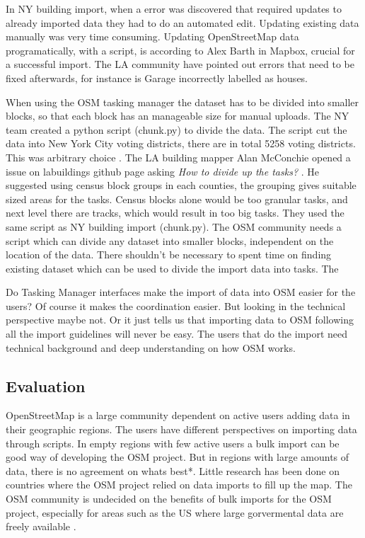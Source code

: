 In NY building import, when a error was discovered that required updates to already imported data they had to do an automated edit. Updating existing data manually was very time consuming. Updating OpenStreetMap data programatically, with a script, is according to Alex Barth in Mapbox, crucial for a successful import.  The LA community have pointed out errors that need to be fixed afterwards, for instance is Garage incorrectly labelled as houses. 

When using the OSM tasking manager the dataset has to be divided into smaller blocks, so that each block has an manageable size for manual uploads. The NY team created a python script (chunk.py) to divide the data. The script cut the data into New York City voting districts, there are in total 5258 voting districts. This was arbitrary choice \cite{Barth2014}. The LA building mapper Alan McConchie opened a issue on labuildings github page asking \textit{How to divide up the tasks?} \cite{McConchie2014}. He suggested using census block groups in each counties, the grouping gives suitable sized areas for the tasks. Census blocks alone would be too granular tasks, and next level there are tracks, which would result in too big tasks. They used the same script as NY building import (chunk.py). The OSM community needs a script which can divide any dataset into smaller blocks, independent on the location of the data. There shouldn't be necessary to spent time on finding existing dataset which can be used to divide the import data into tasks. The 

Do Tasking Manager interfaces make the import of data into OSM easier for the users? Of course it makes the coordination easier. But looking in the technical perspective maybe not. Or it just tells us that importing data to OSM following all the import guidelines will never be easy. The users that do the import need technical background and deep understanding on how OSM works. 


\subsection{Evaluation}
OpenStreetMap is a large community dependent on active users adding data in their geographic regions. The users have different perspectives on importing data through scripts. In empty regions with few active users a bulk import can be good way of developing the OSM project. But in regions with large amounts of data, there is no agreement on whats best*. Little research has been done on countries where the OSM project relied on data imports to fill up the map. The OSM community is undecided on the benefits of bulk imports for the OSM project, especially for areas such as the US where large gorvermental data are freely available \cite{Zielstra2013}.


